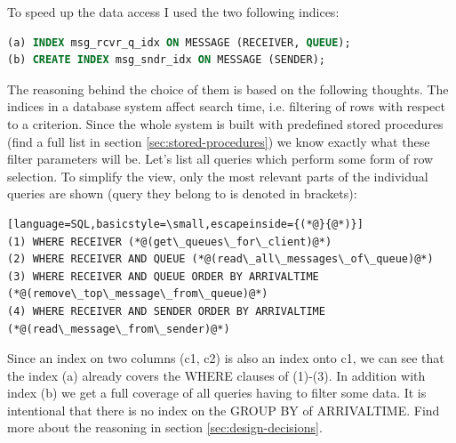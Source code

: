 \documentclass[11pt]{article}
\begin{document}
To speed up the data access I used the two following indices:
\begin{lstlisting}[language=SQL,basicstyle=\small]
(a) INDEX msg_rcvr_q_idx ON MESSAGE (RECEIVER, QUEUE);
(b) CREATE INDEX msg_sndr_idx ON MESSAGE (SENDER);
\end{lstlisting}
The reasoning behind the choice of them is based on the following thoughts. The indices in a database system affect search time, i.e. filtering of rows with respect to a criterion. Since the whole system is built with predefined stored procedures (find a full list in section \ref{sec:stored-procedures}) we know exactly what these filter parameters will be. Let's list all queries which perform some form of row selection. To simplify the view, only the most relevant parts of the individual queries are shown (query they belong to is denoted in brackets):
\begin{lstlisting}[language=SQL,basicstyle=\small,escapeinside={(*@}{@*)}]
(1) WHERE RECEIVER (*@(get\_queues\_for\_client)@*)
(2) WHERE RECEIVER AND QUEUE (*@(read\_all\_messages\_of\_queue)@*)
(3) WHERE RECEIVER AND QUEUE ORDER BY ARRIVALTIME (*@(remove\_top\_message\_from\_queue)@*)
(4) WHERE RECEIVER AND SENDER ORDER BY ARRIVALTIME (*@(read\_message\_from\_sender)@*)
\end{lstlisting}
Since an index on two columns (c1, c2) is also an index onto c1, we can see that the index (a) already covers the WHERE clauses of (1)-(3). In addition with index (b) we get a full coverage of all queries having to filter some data. It is intentional that there is no index on the GROUP BY of ARRIVALTIME. Find more about the reasoning in section \ref{sec:design-decisions}.
\end{document}
